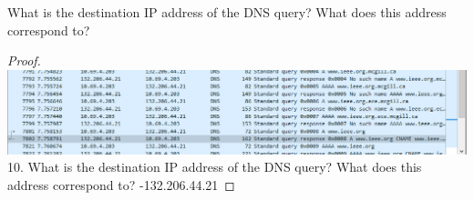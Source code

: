 \documentclass[../../main.tex]{subfiles}
\begin{document}
\begin{wts}
What is the destination IP address of the DNS query? What does this address correspond to?
\end{wts}
\begin{proof}
\includegraphics[width=\textwidth]{subfiles/images/308_Lab5_Part_1_PAGE0_0_Image20.png}
10. What is the destination IP address of the DNS query? What does this address correspond to? -132.206.44.21
\end{proof}
\end{document}
